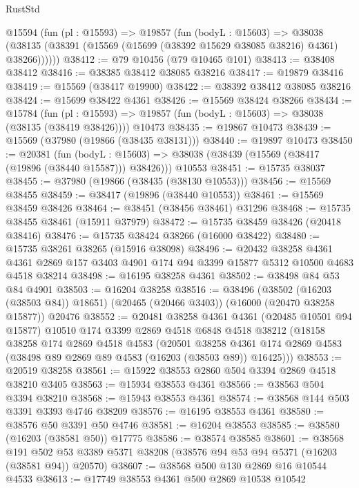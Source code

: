 \begin{lexlean}{RustStd}
\begin{coremodule}
    @15594
      (fun (pl : @15593) =>
      @19857
        (fun (bodyL : @15603) =>
        @38038 (@38135 (@38391 (@15569 (@15699 (@38392 @15629 @38085 @38216) @4361) @38266))))))
@38412 := @79 @10456 (@79 @10465 @101)
@38413 := @38408 @38412
@38416 := @38385 @38412 @38085 @38216
@38417 := @19879 @38416
@38419 := @15569 (@38417 @19900)
@38422 := @38392 @38412 @38085 @38216
@38424 := @15699 @38422 @4361
@38426 := @15569 @38424 @38266
@38434 := @15784
    (fun (pl : @15593) => @19857 (fun (bodyL : @15603) => @38038 (@38135 (@38419 @38426))))
    @10473
@38435 := @19867 @10473
@38439 := @15569 (@37980 (@19866 (@38435 @38131)))
@38440 := @19897 @10473
@38450 := @20381
    (fun (bodyL : @15603) => @38038 (@38439 (@15569 (@38417 (@19896 (@38440 @15587))) @38426)))
    @10553
@38451 := @15735 @38037
@38455 := @37980 (@19866 (@38435 (@38130 @10553)))
@38456 := @15569 @38455
@38459 := @38417 (@19896 (@38440 @10553))
@38461 := @15569 @38459 @38426
@38464 := @38451 (@38456 @38461) @31296
@38468 := @15735 @38455 @38461 (@15911 @37979)
@38472 := @15735 @38459 @38426 (@20418 @38416)
@38476 := @15735 @38424 @38266 (@16000 @38422)
@38480 := @15735 @38261 @38265 (@15916 @38098)
@38496 := @20432
    @38258
    @4361
    @4361
    @2869
    @157
    @3403
    @4901
    @174
    @94
    @3399
    @15877
    @5312
    @10500
    @4683
    @4518
    @38214
@38498 := @16195 @38258 @4361
@38502 := @38498 @84 @53 @84 @4901
@38503 := @16204 @38258
@38516 := @38496
    (@38502 (@16203 (@38503 @84)) @18651)
    (@20465 (@20466 @3403))
    (@16000 (@20470 @38258 @15877))
    @20476
@38552 := @20481
    @38258
    @4361
    @4361
    (@20485 @10501 @94 @15877)
    @10510
    @174
    @3399
    @2869
    @4518
    @6848
    @4518
    @38212
    (@18158
      @38258
      @174
      @2869
      @4518
      @4583
      (@20501
        @38258
        @4361
        @174
        @2869
        @4583
        (@38498 @89 @2869 @89 @4583 (@16203 (@38503 @89)) @16425)))
@38553 := @20519 @38258
@38561 := @15922 @38553 @2860 @504 @3394 @2869 @4518 @38210 @3405
@38563 := @15934 @38553 @4361
@38566 := @38563 @504 @3394 @38210
@38568 := @15943 @38553 @4361
@38574 := @38568 @144 @503 @3391 @3393 @4746 @38209
@38576 := @16195 @38553 @4361
@38580 := @38576 @50 @3391 @50 @4746
@38581 := @16204 @38553
@38585 := @38580 (@16203 (@38581 @50)) @17775
@38586 := @38574 @38585
@38601 := @38568
    @191
    @502
    @53
    @3389
    @5371
    @38208
    (@38576 @94 @53 @94 @5371 (@16203 (@38581 @94)) @20570)
@38607 := @38568 @500 @130 @2869 @16 @10544 @4533
@38613 := @17749 @38553 @4361 @500 @2869 @10538 @10542

\end{coremodule}
\end{lexlean}
